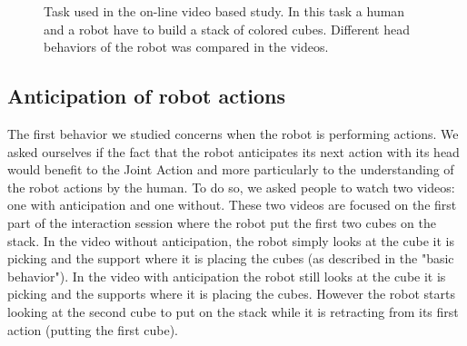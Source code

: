 \documentclass[english,a4paper,11pt,twoside]{StyleThese}
\begin{document}
\begin{figure}[!t]
\centering
	\hfill
    \caption{Task used in the on-line video based study. In this task a human and a robot have to build a stack of colored cubes. Different head behaviors of the robot was compared in the videos.}
    \label{fig:videoTask}
\end{figure}

\subsection{Anticipation of robot actions}

The first behavior we studied concerns when the robot is performing actions. We asked ourselves if the fact that the robot anticipates its next action with its head would benefit to the Joint Action and more particularly to the understanding of the robot actions by the human. To do so, we asked people to watch two videos: one with anticipation and one without. These two videos are focused on the first part of the interaction session where the robot put the first two cubes on the stack. In the video without anticipation, the robot simply looks at the cube it is picking and the support where it is placing the cubes (as described in the "basic behavior"). In the video with anticipation the robot still looks at the cube it is picking and the supports where it is placing the cubes. However the robot starts looking at the second cube to put on the stack while it is retracting from its first action (putting the first cube).
\end{document}
